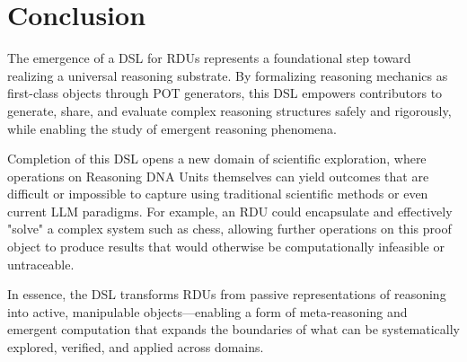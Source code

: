 \documentclass[11pt]{article}
\begin{document}
\section{Conclusion}
The emergence of a DSL for RDUs represents a foundational step toward realizing a universal reasoning substrate. By formalizing reasoning mechanics as first-class objects through POT generators, this DSL empowers contributors to generate, share, and evaluate complex reasoning structures safely and rigorously, while enabling the study of emergent reasoning phenomena.  

Completion of this DSL opens a new domain of scientific exploration, where operations on Reasoning DNA Units themselves can yield outcomes that are difficult or impossible to capture using traditional scientific methods or even current LLM paradigms. For example, an RDU could encapsulate and effectively "solve" a complex system such as chess, allowing further operations on this proof object to produce results that would otherwise be computationally infeasible or untraceable.  

In essence, the DSL transforms RDUs from passive representations of reasoning into active, manipulable objects—enabling a form of meta-reasoning and emergent computation that expands the boundaries of what can be systematically explored, verified, and applied across domains.
\end{document}
